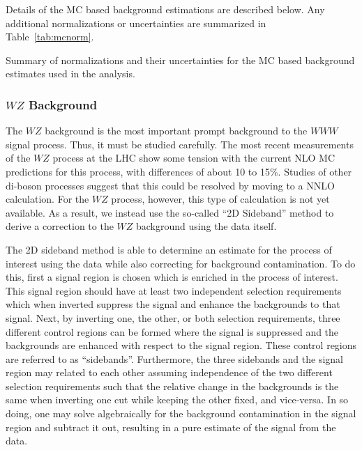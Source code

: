 
Details of the MC based background estimations are described below.
Any additional normalizations or uncertainties are summarized
in Table~\ref{tab:mcnorm}.

\begin{table}[htp]
\centering

\caption{Summary of normalizations and their uncertainties for the
MC based background estimates used in the analysis.}
\label{tab:mcnorm}
\end{table}



\subsubsection{$WZ$ Background}
\label{sec:wzbg}

The $WZ$ background is the most important prompt background 
to the $WWW$ signal process. Thus, it must be studied carefully.
The most recent measurements of the $WZ$ process at the LHC
\cite{Aad:2012twa,Anger:1663539,CMS-PAS-SMP-12-006} 
show some tension with the current NLO MC predictions for this process, 
with differences of about 10 to 15\%. 
Studies of other di-boson processes 
\cite{Grazzini:2015nwa,Cascioli:2014yka}
suggest that this could be resolved by 
moving to a NNLO calculation.
For the $WZ$ process, however, this type of calculation is not yet available.
As a result, we instead use the so-called ``2D Sideband'' method
\cite{Aad:2013izg} to derive a correction
to the $WZ$ background using the data itself.

The 2D sideband method is able to determine an estimate
for the process of interest using the data while also correcting
for background contamination. 
To do this, first a signal region 
is chosen which is enriched in the process of interest.
This signal region should have at least two 
independent selection requirements which when inverted suppress
the signal and enhance the backgrounds to that signal.
Next, by inverting one, the other, or both selection requirements, 
three different control regions can be formed
where the signal is suppressed and the backgrounds are enhanced 
with respect to the signal region. 
These control regions are referred to as ``sidebands''.
Furthermore, the three sidebands and the signal region may
related to each other assuming independence of the two different selection
requirements such that the relative change in the backgrounds is the same
when inverting one cut while keeping the other fixed, and vice-versa.
In so doing, one may solve algebraically for the background contamination 
in the signal region and subtract it out, resulting in a pure
estimate of the signal from the data. 


